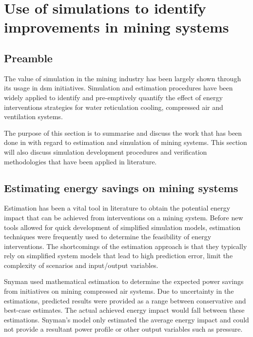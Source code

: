 \section{Use of simulations to identify improvements in mining systems}
	\subsection{Preamble}
	The value of simulation in the mining industry has been largely shown through its usage in \gls{dsm} initiatives. Simulation and estimation procedures have been widely applied to identify and pre-emptively quantify the effect of energy interventions strategies for water reticulation cooling, compressed air and ventilation systems.
	\par
	 The purpose of this section is to summarise and discuss the work that has been done in with regard to estimation and simulation of mining systems. This section will also discuss simulation development procedures and verification methodologies that have been applied in literature.
	
	\subsection{Estimating energy savings on mining systems }
	Estimation has been a vital tool in literature to obtain the potential energy impact that can be achieved from interventions on a mining system. Before new tools allowed for quick development of simplified simulation models, estimation techniques were frequently used to determine the feasibility of energy interventions. The shortcomings of the estimation approach is that they typically rely on simplified system models that lead to high prediction error, limit the complexity of scenarios and input/output variables.
		\par 
	Snyman \cite{Snyman2011Masters} used mathematical estimation to determine the expected power savings from initiatives on mining compressed air systems.  Due to uncertainty in the estimations, \cite{Snyman2011Masters} predicted results were provided as a range between conservative and best-case estimates. The actual achieved energy impact would fall between these estimations. Snyman's model only estimated the average energy impact and could not provide a resultant power profile or other output variables such as pressure.
		 	
